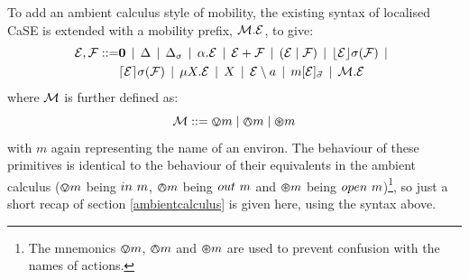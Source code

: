 To add an ambient calculus style of mobility, the existing syntax of
localised CaSE is extended with a mobility prefix, $\text{$\mathcal{M}$} . \text{$\mathcal{E}$}$,
to give:
\begin{equation}
  \begin{aligned}
    \text{$\mathcal{E}$}, \text{$\mathcal{F}$} \mathrel{::=} &
    \textbf{0}  \;\,|\,\; 
    \Delta \;\,|\,\; 
    \Delta_{\sigma} \;\,|\,\; 
    \alpha . \text{$\mathcal{E}$}  \;\,|\,\;
    \text{$\mathcal{E}$} + \text{$\mathcal{F}$} \;\,|\,\; 
    (\text{$\mathcal{E}$}\;|\;\text{$\mathcal{F}$})\;\,|\,\; 
    \lfloor{\text{$\mathcal{E}$}}\rfloor {\sigma} ({\text{$\mathcal{F}$}}) \;\,|\,\; \\
    & \lceil{\text{$\mathcal{E}$}}\rceil {\sigma} ({\text{$\mathcal{F}$}}) \;\,|\,\; 
    \mu X . \text{$\mathcal{E}$} \;\,|\,\; 
    X \;\,|\,\; 
    \text{$\mathcal{E}$} \setminus a \;\,|\,\; 
    {m}[ \text{$\mathcal{E}$} ]_{\vec{\sigma}} \;\,|\,\;
    \text{$\mathcal{M}$} . \text{$\mathcal{E}$}
  \end{aligned}
\end{equation}
where $\text{$\mathcal{M}$}$ is further defined as:
\begin{equation}
   \text{$\mathcal{M}$} \mathrel{::=} \varovee m \mid \varowedge m \mid \varoast m 
\end{equation}
with $m$ again representing the name of an environ.  The behaviour of
these primitives is identical to the behaviour of their equivalents in
the ambient calculus ($\varovee m$ being $in\ m$, $\varowedge m$ being
$out\ m$ and $\varoast m$ being $open\ m$)\footnote{The mnemonics
$\varovee m$, $\varowedge m$ and $\varoast m$ are used to prevent
confusion with the names of actions.}, so just a short recap of section
\ref{ambientcalculus} is given here, using the syntax above.

